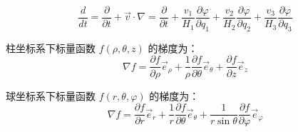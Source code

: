 \documentclass[12pt, a4paper, oneside, UTF8]{ctexbook}  %
\newcommand{\pa}{\partial}
\begin{document}
\begin{corollary}
    \[
    \frac{d}{dt}=\frac{\pa}{\pa t}+\vec{v}\cdot\nabla
    =\frac{\pa}{\pa t}+\frac{v_1}{H_1}\frac{\pa \varphi}{\pa q_1}+\frac{v_2}{H_2}\frac{\pa \varphi}{\pa q_2}
    +\frac{v_3}{H_3}\frac{\pa \varphi}{\pa q_3}
    \]
\end{corollary}
\begin{example}
    柱坐标系下标量函数 \(f(\rho, \theta, z)\) 的梯度为：
\[
\nabla f = \frac{\partial f}{\partial \rho} \vec{e}_\rho + \frac{1}{\rho} \frac{\partial f}{\partial \theta} \vec{e}_\theta + \frac{\partial f}{\partial z} \vec{e}_z
\]
\end{example}
\begin{example}
    球坐标系下标量函数 \(f(r, \theta, \varphi)\) 的梯度为：
\[
\nabla f = \frac{\partial f}{\partial r} \vec{e}_r + \frac{1}{r} \frac{\partial f}{\partial \theta} \vec{e}_\theta + \frac{1}{r \sin \theta} \frac{\partial f}{\partial \varphi} \vec{e}_\varphi
\]
\end{example}
\end{document}
